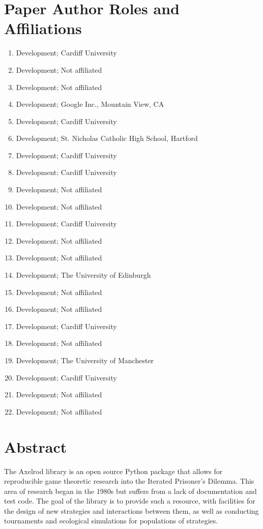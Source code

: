 \documentclass{jors}
\begin{document}
\section*{Paper Author Roles and Affiliations}


\begin{multicols}{2}
    \begin{enumerate}[noitemsep,topsep=0pt]
\item Development; Cardiff University
\item Development; Not affiliated
\item Development; Not affiliated
\item Development; Google Inc., Mountain View, CA
\item Development; Cardiff University
\item Development; St. Nicholas Catholic High School, Hartford
\item Development; Cardiff University
\item Development; Cardiff University
\item Development; Not affiliated
\item Development; Not affiliated
\item Development; Cardiff University
\item Development; Not affiliated
\item Development; Not affiliated
\item Development; The University of Edinburgh
\item Development; Not affiliated
\item Development; Not affiliated
\item Development; Cardiff University
\item Development; Not affiliated
\item Development; The University of Manchester
\item Development; Cardiff University
\item Development; Not affiliated
\item Development; Not affiliated
    \end{enumerate}
\end{multicols}

\section*{Abstract}

The Axelrod library is an open source Python package that allows for
reproducible game theoretic research into the Iterated Prisoner's Dilemma.
This area of research began in the 1980s but suffers from a lack of
documentation and test code. The goal of the library is to provide such
a resource, with facilities for the design of new strategies and
interactions between them, as well as conducting tournaments and ecological
simulations for populations of strategies.
\end{document}
